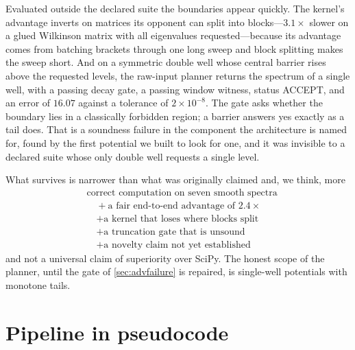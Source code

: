 \documentclass[twocolumn,10pt,a4paper]{article}
\theoremstyle{plain}
\theoremstyle{definition}
\newcommand{\ACCEPT}{\textsf{ACCEPT}}
\begin{document}
Evaluated outside the declared suite the boundaries appear quickly. The kernel's
advantage inverts on matrices its opponent can split into blocks---$3.1\times$
slower on a glued Wilkinson matrix with all eigenvalues requested---because its
advantage comes from batching brackets through one long sweep and block
splitting makes the sweep short. And on a symmetric double well whose central
barrier rises above the requested levels, the raw-input planner returns the
spectrum of a single well, with a passing decay gate, a passing window witness,
status \ACCEPT{}, and an error of $16.07$ against a tolerance of
$2\times10^{-8}$. The gate asks whether the boundary lies in a classically
forbidden region; a barrier answers yes exactly as a tail does. That is a
soundness failure in the component the architecture is named for, found by the
first potential we built to look for one, and it was invisible to a declared
suite whose only double well requests a single level.

What survives is narrower than what was originally claimed and, we think, more
\begin{equation}
\boxed{
\begin{aligned}
&\text{correct computation on seven smooth spectra}\\
&\quad + \text{a fair end-to-end advantage of }2.4\times\\
&\quad + \text{a kernel that loses where blocks split}\\
&\quad + \text{a truncation gate that is unsound}\\
&\quad + \text{a novelty claim not yet established}
\end{aligned}}
\end{equation}
and not a universal claim of superiority over SciPy. The honest scope of the
planner, until the gate of \cref{sec:advfailure} is repaired, is single-well
potentials with monotone tails.

\appendix

\section{Pipeline in pseudocode}
\label{app:pseudocode}
\end{document}
